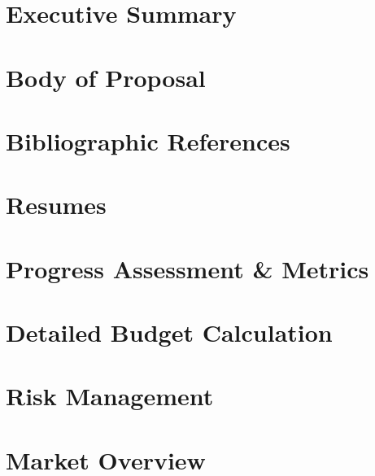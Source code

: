 \documentclass{article}
\begin{document}
 
 \section*{Executive Summary}
 \tableofcontents
 \newpage
 \section{Body of Proposal} 
 \section{Bibliographic References}
 \appendix
 \section{Resumes}
 \section{Progress Assessment \& Metrics}
 \section{Detailed Budget Calculation}
 \section{Risk Management}
 \section{Market Overview}
\end{document}
